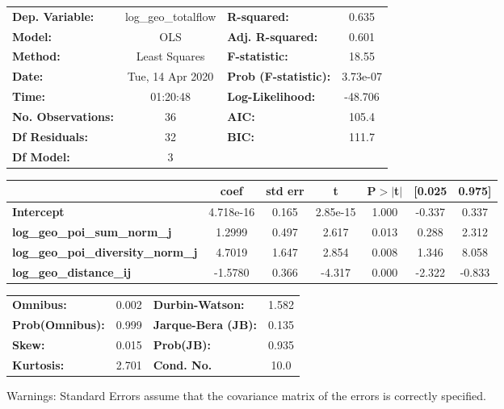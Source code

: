 \begin{center}
\begin{tabular}{lclc}
\toprule
\textbf{Dep. Variable:}                    & log\_geo\_totalflow & \textbf{  R-squared:         } &     0.635   \\
\textbf{Model:}                            &         OLS         & \textbf{  Adj. R-squared:    } &     0.601   \\
\textbf{Method:}                           &    Least Squares    & \textbf{  F-statistic:       } &     18.55   \\
\textbf{Date:}                             &   Tue, 14 Apr 2020  & \textbf{  Prob (F-statistic):} &  3.73e-07   \\
\textbf{Time:}                             &       01:20:48      & \textbf{  Log-Likelihood:    } &   -48.706   \\
\textbf{No. Observations:}                 &            36       & \textbf{  AIC:               } &     105.4   \\
\textbf{Df Residuals:}                     &            32       & \textbf{  BIC:               } &     111.7   \\
\textbf{Df Model:}                         &             3       & \textbf{                     } &             \\
\bottomrule
\end{tabular}
\begin{tabular}{lcccccc}
                                           & \textbf{coef} & \textbf{std err} & \textbf{t} & \textbf{P$> |$t$|$} & \textbf{[0.025} & \textbf{0.975]}  \\
\midrule
\textbf{Intercept}                         &    4.718e-16  &        0.165     &  2.85e-15  &         1.000        &       -0.337    &        0.337     \\
\textbf{log\_geo\_poi\_sum\_norm\_j}       &       1.2999  &        0.497     &     2.617  &         0.013        &        0.288    &        2.312     \\
\textbf{log\_geo\_poi\_diversity\_norm\_j} &       4.7019  &        1.647     &     2.854  &         0.008        &        1.346    &        8.058     \\
\textbf{log\_geo\_distance\_ij}            &      -1.5780  &        0.366     &    -4.317  &         0.000        &       -2.322    &       -0.833     \\
\bottomrule
\end{tabular}
\begin{tabular}{lclc}
\textbf{Omnibus:}       &  0.002 & \textbf{  Durbin-Watson:     } &    1.582  \\
\textbf{Prob(Omnibus):} &  0.999 & \textbf{  Jarque-Bera (JB):  } &    0.135  \\
\textbf{Skew:}          &  0.015 & \textbf{  Prob(JB):          } &    0.935  \\
\textbf{Kurtosis:}      &  2.701 & \textbf{  Cond. No.          } &     10.0  \\
\bottomrule
\end{tabular}
\end{center}

Warnings: \newline
 [1] Standard Errors assume that the covariance matrix of the errors is correctly specified.